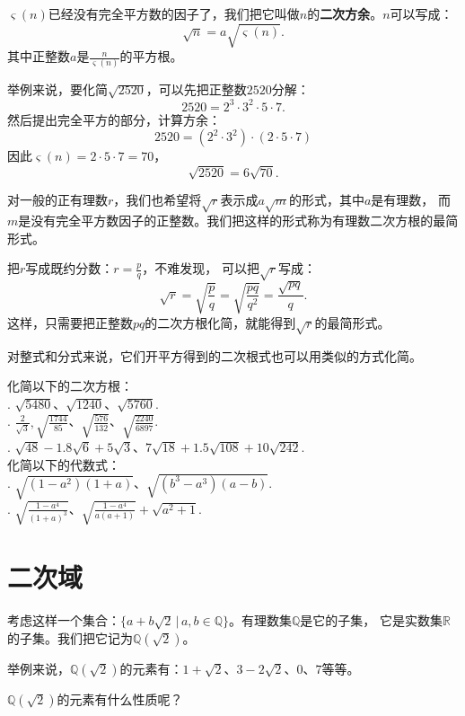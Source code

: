 \documentclass[12pt,UTF8]{ctexbook}
\begin{document}
$\varsigma(n)$已经没有完全平方数的因子了，我们把它叫做$n$的\textbf{二次方余}。$n$可以写成：
$$ \sqrt{n} = a\sqrt{\varsigma(n)}.$$
其中正整数$a$是$\frac{n}{\varsigma(n)}$的平方根。

举例来说，要化简$\sqrt{2520}$，可以先把正整数$2520$分解：
$$ 2520 = 2^3 \cdot 3^2 \cdot 5 \cdot 7.$$
然后提出完全平方的部分，计算方余：
$$ 2520 = \left(2^2 \cdot 3^2 \right) \cdot (2 \cdot 5 \cdot 7)$$
因此$\varsigma(n) = 2 \cdot 5 \cdot 7 = 70$，
$$ \sqrt{2520} = 6 \sqrt{70}.$$

对一般的正有理数$r$，我们也希望将$\sqrt{r}$表示成$a\sqrt{m}$的形式，其中$a$是有理数，
而$m$是没有完全平方数因子的正整数。我们把这样的形式称为有理数二次方根的最简形式。

把$r$写成既约分数：$r = \frac{p}{q}$，不难发现，
可以把$\sqrt{r}$写成：
$$ \sqrt{r} = \sqrt{\frac{p}{q}} = \sqrt{\frac{pq}{q^2}} = \frac{\sqrt{pq}}{q}.$$
这样，只需要把正整数$pq$的二次方根化简，就能得到$\sqrt{r}$的最简形式。

对整式和分式来说，它们开平方得到的二次根式也可以用类似的方式化简。

\begin{xt}\label{xt:3-0-0}
    化简以下的二次方根：\\
    . $\sqrt{5480}$、$\sqrt{1240}$、$\sqrt{5760}$.\\
    . $\frac{2}{\sqrt{3}}, \sqrt{\frac{1744}{85}}$、$\sqrt{\frac{576}{132}}$、$\sqrt{\frac{2240}{6897}}$.\\
    . $\sqrt{48} - 1.8\sqrt{6} + 5\sqrt{3}$、$7\sqrt{18} + 1.5\sqrt{108} + 10\sqrt{242}$.\\
    化简以下的代数式：\\
    . $\sqrt{(1 - a^2)(1 + a)}$、$\sqrt{(b^3 - a^3)(a - b)}$.\\
    . $\sqrt{\frac{1 - a^4}{(1 + a)^3}}$、$\sqrt{\frac{1 - a^4}{a(a+1)}} + \sqrt{a^2+1}$.
\end{xt}

\section{二次域}
考虑这样一个集合：$\{a + b\sqrt{2} \, | \, a, b \in\mathbb{Q}\}$。有理数集$\mathbb{Q}$是它的子集，
它是实数集$\mathbb{R}$的子集。我们把它记为$\mathbb{Q}(\sqrt{2})$。

举例来说，$\mathbb{Q}(\sqrt{2})$的元素有：$1 + \sqrt{2}$、$3 - 2\sqrt{2}$、$0$、$7$等等。

$\mathbb{Q}(\sqrt{2})$的元素有什么性质呢？
\end{document}
